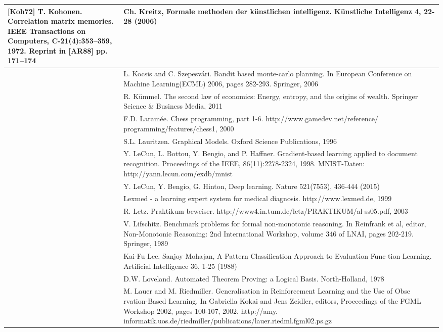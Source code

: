 \documentclass[10pt]{book}
\begin{document}
\begin{center}
\begin{tabular}{|l|l|}
[Koh72] T. Kohonen. Correlation matrix memories. IEEE Transactions on Computers, C-21(4):353–359, 1972. Reprint in [AR88] pp. 171–174
 & Ch. Kreitz, Formale methoden der künstlichen intelligenz. Künstliche Intelligenz 4, 22-28 (2006) \\
\hline [KS06] & L. Kocsis and C. Szepesvári. Bandit based monte-carlo planning. In European Conference on Machine Learning(ECML) 2006, pages 282-293. Springer, 2006 \\
\hline [Küm11] & R. Kümmel. The second law of economics: Energy, entropy, and the origins of wealth. Springer Science \& Business Media, 2011 \\
\hline [Lar00] & F.D. Laramée. Chess programming, part 1-6. http://www.gamedev.net/reference/ programming/features/chess1, 2000 \\
\hline [\cite{lau96}] & S.L. Lauritzen. Graphical Models. Oxford Science Publications, 1996 \\
\hline [LBBH98] & Y. LeCun, L. Bottou, Y. Bengio, and P. Haffner. Gradient-based learning applied to document recognition. Proceedings of the IEEE, 86(11):2278-2324, 1998. MNIST-Daten: http://yann.lecun.com/exdb/mnist \\
\hline [LBH15] & Y. LeCun, Y. Bengio, G. Hinton, Deep learning. Nature 521(7553), 436-444 (2015) \\
\hline [Le999] & Lexmed - a learning expert system for medical diagnosis. http://www.lexmed.de, 1999 \\
\hline [\cite{let03}] & R. Letz. Praktikum beweiser. http://www4.in.tum.de/letz/PRAKTIKUM/al-ss05.pdf, 2003 \\
\hline [\cite{lif89}] & V. Lifschitz. Benchmark problems for formal non-monotonic reasoning. In Reinfrank et al, editor, Non-Monotonic Reasoning: 2nd International Workshop, volume 346 of LNAI, pages 202-219. Springer, 1989 \\
\hline [\cite{lm88}] & Kai-Fu Lee, Sanjoy Mohajan, A Pattern Classification Approach to Evaluation Func tion Learning. Artificial Intelligence 36, 1-25 (1988) \\
\hline [Lov78] & D.W. Loveland. Automated Theorem Proving: a Logical Basis. North-Holland, 1978 \\
\hline [\cite{lr02}] & M. Lauer and M. Riedmiller. Generalisation in Reinforcement Learning and the Use of Obse rvation-Based Learning. In Gabriella Kokai and Jens Zeidler, editors, Proceedings of the FGML Workshop 2002, pages 100-107, 2002. http://amy. informatik.uos.de/riedmiller/publications/lauer.riedml.fgml02.ps.gz \\

\end{tabular}
\end{center}
\end{document}
